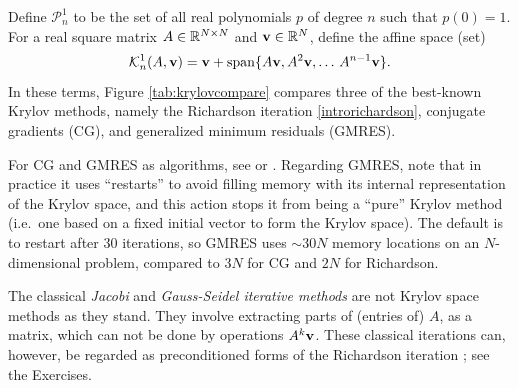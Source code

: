 \newcommand{\Pnone}{\mathcal{P}_n^1}
\newcommand{\Kone}[2]{\mathcal{K}_{#1}^1(#2)}
Define $\Pnone$ to be the set of all real polynomials $p$ of degree $n$ such that $p(0)=1$.  For a real square matrix $A \in \mathbb{R}^{N\times N}$ and $\mathbf{v}\in\mathbb{R}^N$, define the affine space (set)
	$$\Kone{n}{A,\bv} = \bv + \Span\{A\bv,A^2\bv,\dots\,A^{n-1}\bv\}.$$
In these terms, Figure \ref{tab:krylovcompare} compares three of the best-known Krylov methods, namely the Richardson iteration \eqref{introrichardson}, conjugate gradients (CG), and generalized minimum residuals (GMRES).  

For CG and GMRES as algorithms, see \citet{Greenbaum1997} or \citet{Saad2003}.  Regarding GMRES, note that in practice it uses ``restarts'' to avoid filling memory with its internal representation of the Krylov space, and this action stops it from being a ``pure'' Krylov method (i.e.~one based on a fixed initial vector to form the Krylov space).  The \PETSc default is to restart after 30 iterations, so GMRES uses $\sim 30N$ memory locations on an $N$-dimensional problem, compared to $3N$ for CG and $2N$ for Richardson.

The classical \emph{Jacobi} and \emph{Gauss-Seidel iterative methods} \citep{Greenbaum1997} are not Krylov space methods as they stand.  They involve extracting parts of (entries of) $A$, as a matrix, which can not be done by operations $A^k\mathbf{v}$.  These classical iterations can, however, be regarded as preconditioned forms of the Richardson iteration \citep{Greenbaum1997}; see the Exercises.

